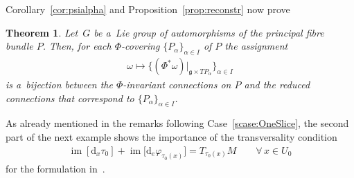 \documentclass[pdftex]{sigma}
\numberwithin{equation}{section}
\newtheorem{Theorem}{Theorem}[section]
\begin{document}
 Corollary~\ref{cor:psialpha} and Proposition~\ref{prop:reconstr} now prove
\begin{Theorem}\label{th:InvConnes}
Let~$G$ be a~Lie group of automorphisms of the principal fibre bundle $P$.
Then, for each $\Phi$-covering $\{P_\alpha\}_{\alpha\in I}$ of $P$
the assignment
\begin{gather*}
	\omega \mapsto \{(\Phi^*\omega)|_{\mathfrak{g}\times TP_\alpha}\}_{\alpha\in I}
\end{gather*}
is a~bijection between
the $\Phi$-invariant connections on $P$ and the
reduced connections that correspond to $\{P_\alpha\}_{\alpha\in I}$.
\end{Theorem}

 As already mentioned in the remarks following Case~\ref{scase:OneSlice}, the second part of the next
example shows the importance of the transversality condition
\begin{gather*}
\operatorname{\mathrm{im}}[\mathrm{d}_x\tau_0] +
\operatorname{\mathrm{im}}\big[\mathrm{d}_e\varphi_{\tau_0(x)}\big]=T_{\tau_0(x)}M
\qquad\forall\, x\in U_0
\end{gather*}
for the formulation in~\cite{HarSni}.
\end{document}
